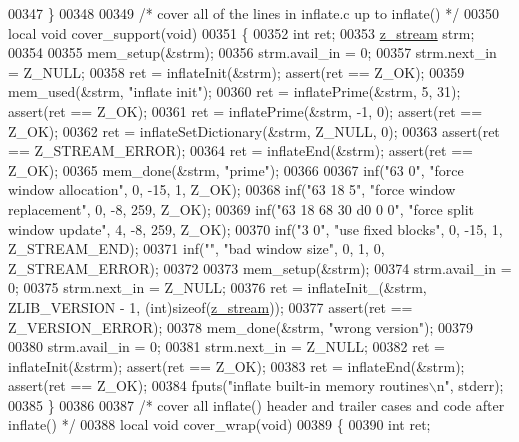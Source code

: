 \begin{DoxyCode}
{{{{{00347 \}
00348 
00349 \textcolor{comment}{/* cover all of the lines in inflate.c up to inflate() */}
00350 local \textcolor{keywordtype}{void} cover\_support(\textcolor{keywordtype}{void})
00351 \{
00352     \textcolor{keywordtype}{int} ret;
00353     \hyperlink{structz__stream__s}{z\_stream} strm;
00354 
00355     mem\_setup(&strm);
00356     strm.avail\_in = 0;
00357     strm.next\_in = Z\_NULL;
00358     ret = inflateInit(&strm);                   assert(ret == Z\_OK);
00359     mem\_used(&strm, \textcolor{stringliteral}{"inflate init"});
00360     ret = inflatePrime(&strm, 5, 31);           assert(ret == Z\_OK);
00361     ret = inflatePrime(&strm, -1, 0);           assert(ret == Z\_OK);
00362     ret = inflateSetDictionary(&strm, Z\_NULL, 0);
00363                                                 assert(ret == Z\_STREAM\_ERROR);
00364     ret = inflateEnd(&strm);                    assert(ret == Z\_OK);
00365     mem\_done(&strm, \textcolor{stringliteral}{"prime"});
00366 
00367     inf(\textcolor{stringliteral}{"63 0"}, \textcolor{stringliteral}{"force window allocation"}, 0, -15, 1, Z\_OK);
00368     inf(\textcolor{stringliteral}{"63 18 5"}, \textcolor{stringliteral}{"force window replacement"}, 0, -8, 259, Z\_OK);
00369     inf(\textcolor{stringliteral}{"63 18 68 30 d0 0 0"}, \textcolor{stringliteral}{"force split window update"}, 4, -8, 259, Z\_OK);
00370     inf(\textcolor{stringliteral}{"3 0"}, \textcolor{stringliteral}{"use fixed blocks"}, 0, -15, 1, Z\_STREAM\_END);
00371     inf(\textcolor{stringliteral}{""}, \textcolor{stringliteral}{"bad window size"}, 0, 1, 0, Z\_STREAM\_ERROR);
00372 
00373     mem\_setup(&strm);
00374     strm.avail\_in = 0;
00375     strm.next\_in = Z\_NULL;
00376     ret = inflateInit\_(&strm, ZLIB\_VERSION - 1, (\textcolor{keywordtype}{int})\textcolor{keyword}{sizeof}(\hyperlink{structz__stream__s}{z\_stream}));
00377                                                 assert(ret == Z\_VERSION\_ERROR);
00378     mem\_done(&strm, \textcolor{stringliteral}{"wrong version"});
00379 
00380     strm.avail\_in = 0;
00381     strm.next\_in = Z\_NULL;
00382     ret = inflateInit(&strm);                   assert(ret == Z\_OK);
00383     ret = inflateEnd(&strm);                    assert(ret == Z\_OK);
00384     fputs(\textcolor{stringliteral}{"inflate built-in memory routines\(\backslash\)n"}, stderr);
00385 \}
00386 
00387 \textcolor{comment}{/* cover all inflate() header and trailer cases and code after inflate() */}
00388 local \textcolor{keywordtype}{void} cover\_wrap(\textcolor{keywordtype}{void})
00389 \{
00390     \textcolor{keywordtype}{int} ret;
}}}}}
\end{DoxyCode}
